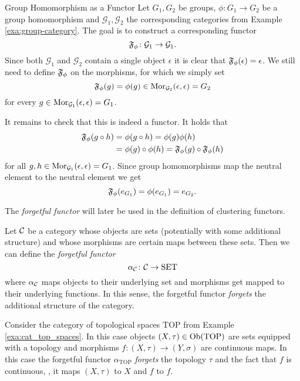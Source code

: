 \begin{example}{Group Homomorphism as a Functor}{}
Let $G_1, G_2$ be groups, $\phi\colon G_1 \to G_2$ be a group homomorphism and $\mathcal{G}_1,\mathcal{G}_2$ the corresponding categories from Example \ref{exa:group-category}. The goal is to construct a corresponding functor 
$$
\mathfrak{F}_\phi\colon \mathcal{G}_1 \to \mathcal{G}_1.
$$
Since both $\mathcal{G}_1$ and $\mathcal{G}_2$ contain a single object $\epsilon$ it is clear that $\mathfrak{F}_\phi(\epsilon) = \epsilon$. We still need to define $\mathfrak{F}_\phi$ on the morphisms, for which we simply set
$$
\mathfrak{F}_\phi(g) = \phi(g) \in \mathrm {Mor}_{\mathcal{G}_2}(\epsilon, \epsilon) = G_2
$$
for every $g \in \mathrm {Mor}_{\mathcal{G}_1}(\epsilon, \epsilon) = G_1$. \par

\medskip It remains to check that this is indeed a functor. It holds that
\begin{equation*}
\begin{split}
\mathfrak{F}_\phi(g \circ h) &= \phi(g \circ h) = \phi(g)\phi(h) \\
&= \phi(g) \circ \phi(h) = \mathfrak{F}_\phi(g) \circ \mathfrak{F}_\phi(h)
\end{split}
\end{equation*}
for all $g,h \in \mathrm {Mor}_{\mathcal{G}_1}(\epsilon, \epsilon) = G_1$. Since group homomorphisms map the neutral element to the neutral element we get
\begin{equation*}
\mathfrak{F}_\phi(e_{G_1}) = \phi(e_{G_1}) = e_{G_2}.
\end{equation*}
\end{example}

The \emph{forgetful functor} will later be used in the definition of clustering functors.

\begin{definition}{\cite[Chap.~1~Ex.~10]{Roman2017}}{}
Let $\mathcal{C}$ be a category whose objects are sets (potentially with some additional structure) and whose morphisms are certain maps between these sets. Then we can define the \emph{forgetful functor}
$$
\alpha_{\mathcal{C}}\colon \mathcal{C} \to \mathrm{SET}
$$
where $\alpha_{\mathcal{C}}$ maps objects to their underlying set and morphisms get mapped to their underlying functions. In this sense, the forgetful functor \emph{forgets} the additional structure of the category.
\end{definition}

\begin{example}{}{}
Consider the category of topological spaces $\mathrm{TOP}$ from Example \ref{exa:cat_top_spaces}. In this case objects $(X,\tau) \in \mathrm {Ob}(\mathrm{TOP})$ are sets equipped with a topology and morphisms $f\colon (X,\tau) \to (Y,\sigma)$ are continuous maps.
In this case the forgetful functor $\alpha_{\mathrm{TOP}}$ \emph{forgets} the topology $\tau$ and the fact that $f$ is continuous, \ie, it maps $(X,\tau)$ to $X$ and $f$ to $f$.
\end{example}

